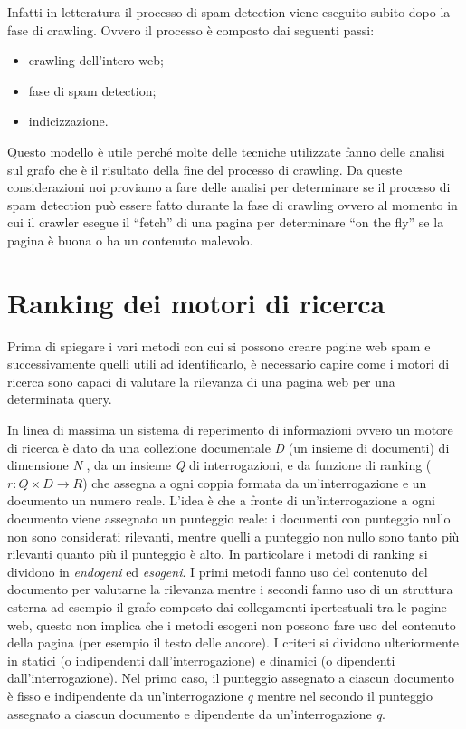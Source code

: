 Infatti in letteratura il processo di spam detection viene eseguito subito dopo la fase di crawling. Ovvero il processo è composto dai seguenti passi:
\begin{itemize}
 \item crawling dell'intero web;
 \item fase di spam detection;
 \item indicizzazione.
\end{itemize}
Questo modello è utile perché molte delle tecniche utilizzate fanno delle analisi sul grafo che è il risultato della fine del processo di crawling. Da queste considerazioni noi proviamo a fare delle analisi per determinare se il processo di spam detection può essere fatto durante la fase di crawling ovvero al momento in cui il crawler esegue il ``fetch'' di una pagina per determinare ``on the fly'' se la pagina è buona o ha un contenuto malevolo. 

\section{Ranking dei motori di ricerca}
Prima di spiegare i vari metodi con cui si possono creare pagine web spam e successivamente quelli utili ad identificarlo, è necessario capire come i motori di ricerca sono capaci di valutare la rilevanza di una pagina web per una determinata query.

In linea di massima un sistema di reperimento di informazioni ovvero un motore di ricerca è dato da una collezione documentale \textit{D} (un insieme di documenti) di dimensione \textit{N} , da un insieme \textit{Q} di interrogazioni, e da funzione di ranking (\(r : Q \times D \rightarrow R\)) che
assegna a ogni coppia formata da un’interrogazione e un documento un numero reale. L’idea è che a fronte di un’interrogazione a ogni documento viene assegnato un punteggio reale: i documenti con punteggio nullo non sono considerati rilevanti, mentre quelli a punteggio non nullo sono tanto più rilevanti quanto più il punteggio è alto. In particolare i metodi di ranking si dividono in \textit{endogeni} ed \textit{esogeni}. I primi metodi fanno uso del contenuto del documento per valutarne la rilevanza mentre i secondi fanno uso di un struttura esterna ad esempio il grafo composto dai collegamenti ipertestuali tra le pagine web, questo non implica che i metodi esogeni non possono fare uso del contenuto della pagina (per esempio il testo delle ancore). I criteri si dividono ulteriormente in statici (o indipendenti dall’interrogazione) e dinamici (o dipendenti dall’interrogazione). Nel primo caso, il punteggio assegnato a ciascun documento è fisso e indipendente da un'interrogazione \textit{q} mentre nel secondo il punteggio assegnato a ciascun documento e dipendente da un'interrogazione \textit{q}.

